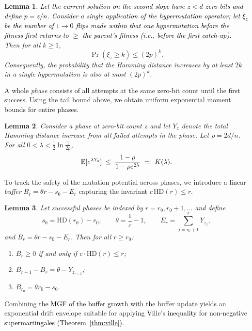 \documentclass[lettersize,journal]{IEEEtran}
\newcommand{\new}[1]{\textcolor{black}{#1}}
\newcommand{\rev}[1]{\textcolor{black}{#1}}
\newcommand{\rerev}[1]{\textcolor{black}{#1}}
\newcommand{\EE}{\mathbb{E}}
\newtheorem{lemma}{Lemma}
\begin{document}
{\begin{lemma}\label{lem:xi-tail}
	\textcolor{black}{Let the current solution on the second slope have \rerev{$z< d$} zero-bits and
	define $p=z/n$.
	Consider a single application of the hypermutation operator; let $\xi_z$ be
	the number of $1\to0$ flips made \emph{within that one hypermutation} before
	the fitness first returns to $\ge$ the parent's fitness (i.e., before the
	first catch-up).}
	Then for all $k\ge1$,
	\[
	\Pr(\xi_z\ge k)\le (2p)^k.
	\]
	Consequently, the probability that the Hamming distance increases by at least 
	$2k$ in a single hypermutation is also at most $(2p)^k$.
\end{lemma}



A whole \emph{phase} consists of all attempts at the same zero-bit count until the 
first success.  
Using the tail bound above, we obtain uniform exponential moment bounds for 
entire phases.

\begin{lemma}\label{lem:phase-mgf}
	Consider a phase at zero-bit count $z$ and let $Y_z$ denote the total 
	Hamming-distance increase from all failed attempts in the phase.  
	Let $\rho = 2d/n$.  
	For all $0<\lambda<\tfrac12\ln\frac{1}{2\rho}$,
	\[
	\EE[e^{\lambda Y_z}] 
	\;\le\; 
	\textcolor{black}{\frac{1-\rho}{1-\rho e^{2\lambda}}
	\;\eqqcolon\; K(\lambda).}
	\]
\end{lemma}



To track the safety of the mutation potential across phases, we introduce a 
linear \emph{buffer} \new{$B_r = \theta r - s_0 - E_r$} capturing the invariant $c\,\mathrm{HD}(r)\le r$.

\begin{lemma}\label{lem:buffer}
	Let successful phases be indexed by $r=r_0,r_0+1,\dots$ and define
	\[
	s_0=\mathrm{HD}(r_0)-r_0, \qquad 
	\theta=\frac{1}{c}-1, \qquad
	E_r=\sum_{j=r_0+1}^{r} Y_{z_j},
	\]
	and $B_r = \theta r - s_0 - E_r$.
	Then for all $r\ge r_0$:
	\begin{enumerate}
		\item 
		$B_r\ge0$ if and only if $c\cdot\mathrm{HD}(r)\le r$;
		\item 
		$B_{r+1}-B_r=\theta-Y_{z_{r+1}}$;
		\item 
		$B_{r_0}=\theta r_0 - s_0$.
	\end{enumerate}
\end{lemma}


Combining \rev{the MGF of the buffer growth} with the buffer update yields an exponential drift 
envelope suitable for applying \textcolor{black}{Ville's inequality for non-negative supermartingales (Theorem~\ref{thm:ville}).}

}
\end{document}
